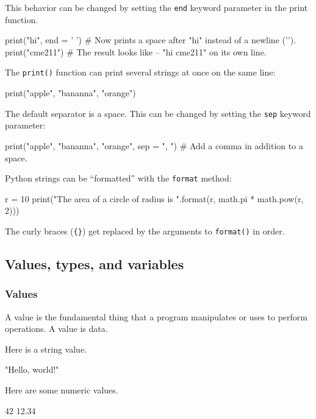 \documentclass[12pt,letterpaper,twoside]{article}
\begin{document}
This behavior can be changed by setting the \texttt{end} keyword
parameter in the print function.

\begin{python}
print("hi", end = ' ')  # Now prints a space after "hi" instead of a newline ('\n').
print("cme211")         # The result looks like -- "hi cme211" on its own line.
\end{python}

The \texttt{print()} function can print several strings at once on the
same line:

\begin{python}
print("apple", "bananna", "orange")
\end{python}

The default separator is a space. This can be changed by setting the
\texttt{sep} keyword parameter:

\begin{python}
print("apple", "bananna", "orange", sep = ", ")  # Add a comma in addition to a space.
\end{python}

Python strings can be ``formatted'' with the \texttt{format} method:

\begin{python}
r = 10
print("The area of a circle of radius {} is {}".format(r, math.pi * math.pow(r, 2)))
\end{python}

The curly braces (\texttt{\{\}}) get replaced by the arguments to
\texttt{format()} in order.

\subsection{Values, types, and variables}

\subsubsection{Values}
A value is the fundamental thing that a program manipulates or uses to
perform operations. A value is data.

Here is a string value.

\begin{python}
"Hello, world!"
\end{python}

Here are some numeric values.

\begin{python}
42
12.34
\end{python}
\end{document}
